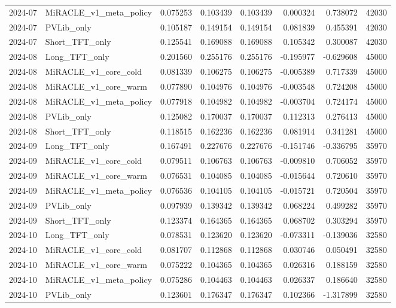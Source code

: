 \begin{tabular}{llrrrrrr}
2024-07 & MiRACLE_v1_meta_policy & 0.075253 & 0.103439 & 0.103439 & 0.000324 & 0.738072 & 42030 \\
2024-07 & PVLib_only & 0.105187 & 0.149154 & 0.149154 & 0.081839 & 0.455391 & 42030 \\
2024-07 & Short_TFT_only & 0.125541 & 0.169088 & 0.169088 & 0.105342 & 0.300087 & 42030 \\
2024-08 & Long_TFT_only & 0.201560 & 0.255176 & 0.255176 & -0.195977 & -0.629608 & 45000 \\
2024-08 & MiRACLE_v1_core_cold & 0.081339 & 0.106275 & 0.106275 & -0.005389 & 0.717339 & 45000 \\
2024-08 & MiRACLE_v1_core_warm & 0.077890 & 0.104976 & 0.104976 & -0.003548 & 0.724208 & 45000 \\
2024-08 & MiRACLE_v1_meta_policy & 0.077918 & 0.104982 & 0.104982 & -0.003704 & 0.724174 & 45000 \\
2024-08 & PVLib_only & 0.125082 & 0.170037 & 0.170037 & 0.112313 & 0.276413 & 45000 \\
2024-08 & Short_TFT_only & 0.118515 & 0.162236 & 0.162236 & 0.081914 & 0.341281 & 45000 \\
2024-09 & Long_TFT_only & 0.167491 & 0.227676 & 0.227676 & -0.151746 & -0.336795 & 35970 \\
2024-09 & MiRACLE_v1_core_cold & 0.079511 & 0.106763 & 0.106763 & -0.009810 & 0.706052 & 35970 \\
2024-09 & MiRACLE_v1_core_warm & 0.076531 & 0.104085 & 0.104085 & -0.015644 & 0.720610 & 35970 \\
2024-09 & MiRACLE_v1_meta_policy & 0.076536 & 0.104105 & 0.104105 & -0.015721 & 0.720504 & 35970 \\
2024-09 & PVLib_only & 0.097939 & 0.139342 & 0.139342 & 0.068224 & 0.499282 & 35970 \\
2024-09 & Short_TFT_only & 0.123374 & 0.164365 & 0.164365 & 0.068702 & 0.303294 & 35970 \\
2024-10 & Long_TFT_only & 0.078531 & 0.123620 & 0.123620 & -0.073311 & -0.139036 & 32580 \\
2024-10 & MiRACLE_v1_core_cold & 0.081707 & 0.112868 & 0.112868 & 0.030746 & 0.050491 & 32580 \\
2024-10 & MiRACLE_v1_core_warm & 0.075222 & 0.104365 & 0.104365 & 0.026316 & 0.188159 & 32580 \\
2024-10 & MiRACLE_v1_meta_policy & 0.075286 & 0.104463 & 0.104463 & 0.026337 & 0.186640 & 32580 \\
2024-10 & PVLib_only & 0.123601 & 0.176347 & 0.176347 & 0.102366 & -1.317899 & 32580 \\

\end{tabular}
